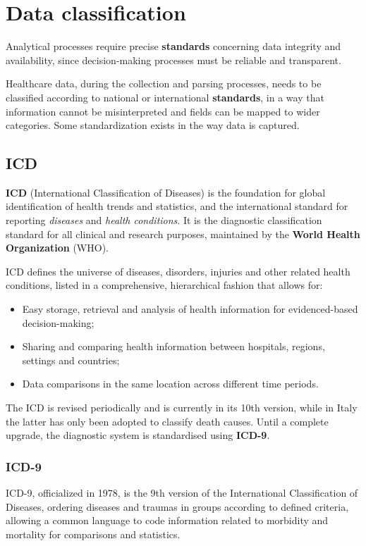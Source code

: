 \section{Data classification}
Analytical processes require precise \textbf{standards} concerning data integrity and availability, since decision-making processes must be reliable and transparent.

Healthcare data, during the collection and parsing processes, needs to be classified according to national or international \textbf{standards}, in a way that information cannot be misinterpreted and fields can be mapped to wider categories. Some standardization exists in the way data is captured.

\subsection{ICD}
\textbf{ICD} (International Classification of Diseases) is the foundation for global identification of health trends and statistics, and the international standard for reporting \textit{diseases} and \textit{health conditions}. It is the diagnostic classification standard for all clinical and research purposes\cite{who}, maintained by the \textbf{World Health Organization} (WHO).

ICD defines the universe of diseases, disorders, injuries and other related health conditions, listed in a comprehensive, hierarchical fashion that allows for: 
\begin{itemize}
	\item Easy storage, retrieval and analysis of health information for evidenced-based decision-making;
	\item Sharing and comparing health information between hospitals, regions, settings and countries;
	\item Data comparisons in the same location across different time periods\cite{whoicd}.
\end{itemize}

The ICD is revised periodically and is currently in its 10th version, while in Italy the latter has only been adopted to classify death causes\cite{icdit}. Until a complete upgrade, the diagnostic system is standardised using \textbf{ICD-9}.

\subsubsection{ICD-9}
ICD-9, officialized in 1978, is the 9th version of the International Classification of Diseases, ordering diseases and traumas in groups according to defined criteria, allowing a common language to code information related to morbidity and mortality for comparisons and statistics\cite{icdit}.

